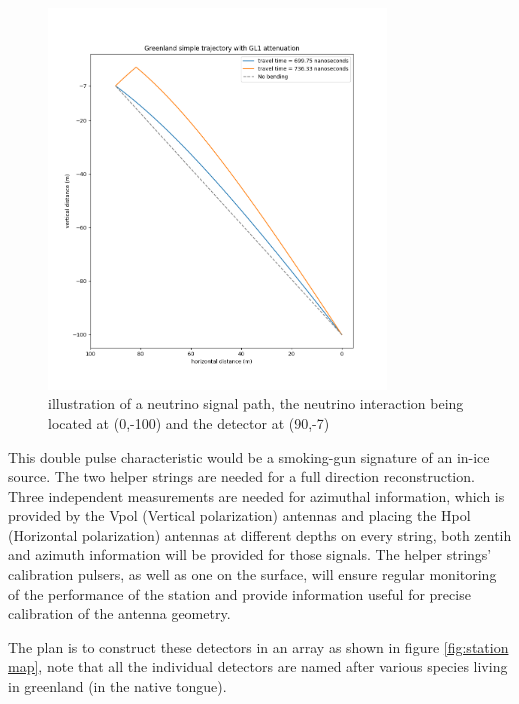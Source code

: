 \documentclass[11pt,a4paper,faculty=we,language=en,doctype=report]{cls/ugent-doc}
\begin{document}
\begin{figure}
	\centering
	\includegraphics[width=0.8\textwidth]{figures/path_illustration.png}	
	\caption{illustration of a neutrino signal path, the neutrino interaction 
	being located at (0,-100) and the detector at (90,-7)}
	\label{fig:path_illustration}
\end{figure}


This double pulse characteristic would be a smoking-gun signature of an in-ice
source. The two helper strings are needed for a full direction reconstruction.
Three independent measurements are needed for azimuthal information, which is
provided by the Vpol (Vertical polarization) antennas and placing the Hpol
(Horizontal polarization) antennas at different depths on every string, both
zentih and azimuth information will be provided for those signals. The helper
strings' calibration pulsers, as well as one on the surface, will ensure
regular monitoring of the performance of the station and provide information
useful for precise calibration of the antenna geometry.

The plan is to construct these detectors in an array as shown in figure 
\ref{fig:station map}, note that all the individual detectors are named after
various species living in greenland (in the native tongue).
\end{document}
